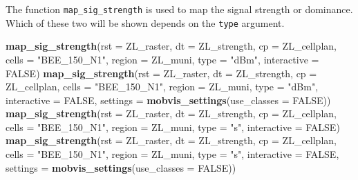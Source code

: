 \documentclass[
]{article}
\newenvironment{Shaded}{\begin{snugshade}}{\end{snugshade}}
\newcommand{\DataTypeTok}[1]{\textcolor[rgb]{0.13,0.29,0.53}{#1}}
\newcommand{\KeywordTok}[1]{\textcolor[rgb]{0.13,0.29,0.53}{\textbf{#1}}}
\newcommand{\NormalTok}[1]{#1}
\newcommand{\OtherTok}[1]{\textcolor[rgb]{0.56,0.35,0.01}{#1}}
\newcommand{\StringTok}[1]{\textcolor[rgb]{0.31,0.60,0.02}{#1}}
\begin{document}
The function \texttt{map\_sig\_strength} is used to map the signal
strength or dominance. Which of these two will be shown depends on the
\texttt{type} argument.

\begin{Shaded}
\begin{Highlighting}[]
\KeywordTok{map_sig_strength}\NormalTok{(}\DataTypeTok{rst =}\NormalTok{ ZL_raster, }
                 \DataTypeTok{dt =}\NormalTok{ ZL_strength, }
                 \DataTypeTok{cp =}\NormalTok{ ZL_cellplan, }
                 \DataTypeTok{cells =} \StringTok{"BEE_150_N1"}\NormalTok{, }
                 \DataTypeTok{region =}\NormalTok{ ZL_muni, }
                 \DataTypeTok{type =} \StringTok{"dBm"}\NormalTok{, }
                 \DataTypeTok{interactive =} \OtherTok{FALSE}\NormalTok{)}
\KeywordTok{map_sig_strength}\NormalTok{(}\DataTypeTok{rst =}\NormalTok{ ZL_raster, }
                 \DataTypeTok{dt =}\NormalTok{ ZL_strength, }
                 \DataTypeTok{cp =}\NormalTok{ ZL_cellplan, }
                 \DataTypeTok{cells =} \StringTok{"BEE_150_N1"}\NormalTok{, }
                 \DataTypeTok{region =}\NormalTok{ ZL_muni, }
                 \DataTypeTok{type =} \StringTok{"dBm"}\NormalTok{, }
                 \DataTypeTok{interactive =} \OtherTok{FALSE}\NormalTok{, }
                 \DataTypeTok{settings =} \KeywordTok{mobvis_settings}\NormalTok{(}\DataTypeTok{use_classes =} \OtherTok{FALSE}\NormalTok{))}
\KeywordTok{map_sig_strength}\NormalTok{(}\DataTypeTok{rst =}\NormalTok{ ZL_raster, }
                 \DataTypeTok{dt =}\NormalTok{ ZL_strength, }
                 \DataTypeTok{cp =}\NormalTok{ ZL_cellplan, }
                 \DataTypeTok{cells =} \StringTok{"BEE_150_N1"}\NormalTok{, }
                 \DataTypeTok{region =}\NormalTok{ ZL_muni, }
                 \DataTypeTok{type =} \StringTok{"s"}\NormalTok{, }
                 \DataTypeTok{interactive =} \OtherTok{FALSE}\NormalTok{)}
\KeywordTok{map_sig_strength}\NormalTok{(}\DataTypeTok{rst =}\NormalTok{ ZL_raster, }
                 \DataTypeTok{dt =}\NormalTok{ ZL_strength, }
                 \DataTypeTok{cp =}\NormalTok{ ZL_cellplan, }
                 \DataTypeTok{cells =} \StringTok{"BEE_150_N1"}\NormalTok{, }
                 \DataTypeTok{region =}\NormalTok{ ZL_muni, }
                 \DataTypeTok{type =} \StringTok{"s"}\NormalTok{, }
                 \DataTypeTok{interactive =} \OtherTok{FALSE}\NormalTok{, }
                 \DataTypeTok{settings =} \KeywordTok{mobvis_settings}\NormalTok{(}\DataTypeTok{use_classes =} \OtherTok{FALSE}\NormalTok{))}
\end{Highlighting}
\end{Shaded}
\end{document}
